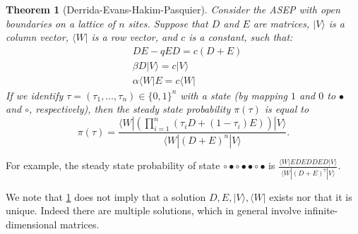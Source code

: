 \documentclass[11pt]{amsart}
\newtheorem{theorem}{Theorem}[section]
\theoremstyle{definition}
\theoremstyle{remark}
\newcommand{\ttt}{\tau}
\begin{document}
	\begin{theorem}[Derrida-Evans-Hakim-Pasquier]  \label{ansatz}
Consider the ASEP with open boundaries
on a lattice of $n$ sites.
Suppose that $D$ and $E$ are matrices,  $|V\rangle$ is a column vector,
$\langle W|$ is a row vector, and $c$ is a constant,
such that:
\begin{align}
	& DE - qED = c(D+E) \label{eq:1} \\
	& \beta D|V\rangle =  c |V\rangle \label{eq:2} \\
	& \alpha \langle W|E =  c \langle W| \label{eq:3}
\end{align}
If we identify $\tau = (\tau_1,\dots,\tau_n)\in \{0,1\}^n$ with a state
(by mapping $1$ and $0$ to $\bullet$ and $\circ$, respectively), then 
	the steady state probability $\pi(\tau)$ is equal to 
\begin{equation*}
	{\pi}(\ttt) = \frac{\langle W|(\prod_{i=1}^n (\ttt_i D + (1-\ttt_i)E))|V\rangle}{\langle W|(D+E)^n|V\rangle}.
\end{equation*}
\end{theorem}

For example,  the steady state probability of 
state $\circ \bullet \circ \bullet \bullet \circ \bullet$ is 
$\frac{\langle W|EDEDDED|V\rangle}{\langle W|(D+E)^7|V\rangle}$.

We note that \cref{ansatz}  does not 
imply that a solution $D, E, |V\rangle, \langle W|$ exists nor that it is unique.  
Indeed there are multiple solutions, which in general involve 
infinite-dimensional matrices.
\end{document}
